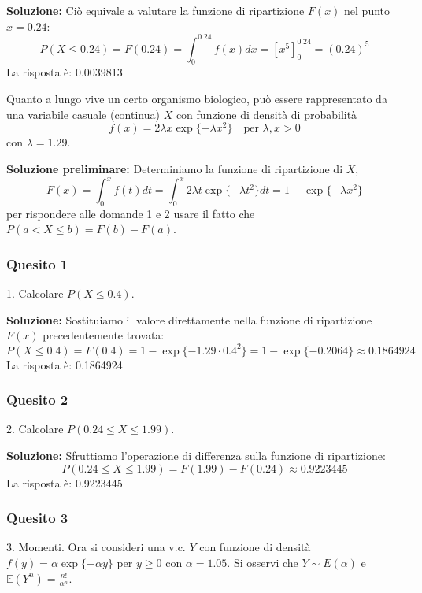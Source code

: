 \documentclass[12pt, a4paper]{article}
\begin{document}
\textbf{Soluzione:}
Ciò equivale a valutare la funzione di ripartizione $F(x)$ nel punto $x=0.24$:
$$ P(X \leq 0.24) = F(0.24) = \int_0^{0.24} f(x) dx = \left[ x^5 \right]_0^{0.24} = (0.24)^5 $$
La risposta è: 0.0039813


\vspace{0.5cm}
\begin{tcolorbox}[colback=lightergray!10, colframe=tocsec, title=\textbf{Esercizio 8}]
Quanto a lungo vive un certo organismo biologico, può essere rappresentato da una variabile casuale (continua) $X$ con funzione di densità di probabilità 
$$ f(x) = 2\lambda x \exp\{-\lambda x^2\} \quad \text{per } \lambda, x > 0 $$
con $\lambda=1.29$.
\end{tcolorbox}

\vspace{0.3cm}
\textbf{Soluzione preliminare:} Determiniamo la funzione di ripartizione di $X$, 
$$ F(x) = \int_0^x f(t) dt = \int_0^x 2\lambda t \exp\{-\lambda t^2\} dt = 1 - \exp\{-\lambda x^2\} $$
per rispondere alle domande 1 e 2 usare il fatto che $P(a < X \leq b) = F(b) - F(a)$.

\subsubsection*{Quesito 1}
1. Calcolare $P(X \leq 0.4)$.

\textbf{Soluzione:}
Sostituiamo il valore direttamente nella funzione di ripartizione $F(x)$ precedentemente trovata:
$$ P(X \leq 0.4) = F(0.4) = 1 - \exp\{-1.29 \cdot 0.4^2\} = 1 - \exp\{-0.2064\} \approx 0.1864924 $$
La risposta è: 0.1864924

\subsubsection*{Quesito 2}
2. Calcolare $P(0.24 \leq X \leq 1.99)$.

\textbf{Soluzione:}
Sfruttiamo l'operazione di differenza sulla funzione di ripartizione:
$$ P(0.24 \leq X \leq 1.99) = F(1.99) - F(0.24) \approx 0.9223445 $$
La risposta è: 0.9223445

\newpage

\subsubsection*{Quesito 3}
3. Momenti. Ora si consideri una v.c. $Y$ con funzione di densità $f(y) = \alpha \exp\{-\alpha y\}$ per $y \geq 0$ con $\alpha=1.05$. Si osservi che $Y \sim E(\alpha)$ e $\mathbb{E}(Y^n) = \frac{n!}{\alpha^n}$.
\end{document}
